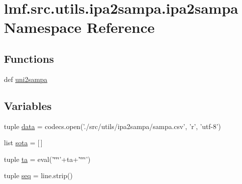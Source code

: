 \hypertarget{namespacelmf_1_1src_1_1utils_1_1ipa2sampa_1_1ipa2sampa}{\section{lmf.\+src.\+utils.\+ipa2sampa.\+ipa2sampa Namespace Reference}
\label{namespacelmf_1_1src_1_1utils_1_1ipa2sampa_1_1ipa2sampa}
}
\subsection*{Functions}
\begin{DoxyCompactItemize}
\item 
def \hyperlink{namespacelmf_1_1src_1_1utils_1_1ipa2sampa_1_1ipa2sampa_af77b860d37ddfcd77e56bf7ed1e897b8}{uni2sampa}
\end{DoxyCompactItemize}
\subsection*{Variables}
\begin{DoxyCompactItemize}
\item 
tuple \hyperlink{namespacelmf_1_1src_1_1utils_1_1ipa2sampa_1_1ipa2sampa_a8a95155398fd80089637dc91bec08dd4}{data} = codecs.\+open('./src/utils/ipa2sampa/sampa.\+csv', 'r', 'utf-\/8')
\item 
list \hyperlink{namespacelmf_1_1src_1_1utils_1_1ipa2sampa_1_1ipa2sampa_aafe2729198b6e17baf543acf1cde5a2c}{sota} = \mbox{[}$\,$\mbox{]}
\item 
tuple \hyperlink{namespacelmf_1_1src_1_1utils_1_1ipa2sampa_1_1ipa2sampa_a2fad537cd70d78b8061780b2a2a8d986}{ta} = eval('\char`\"{}\char`\"{}\char`\"{}'+ta+'\char`\"{}\char`\"{}\char`\"{}')
\item 
tuple \hyperlink{namespacelmf_1_1src_1_1utils_1_1ipa2sampa_1_1ipa2sampa_a2bff6b612a31a796771c153db6ee739b}{seq} = line.\+strip()
\end{DoxyCompactItemize}



